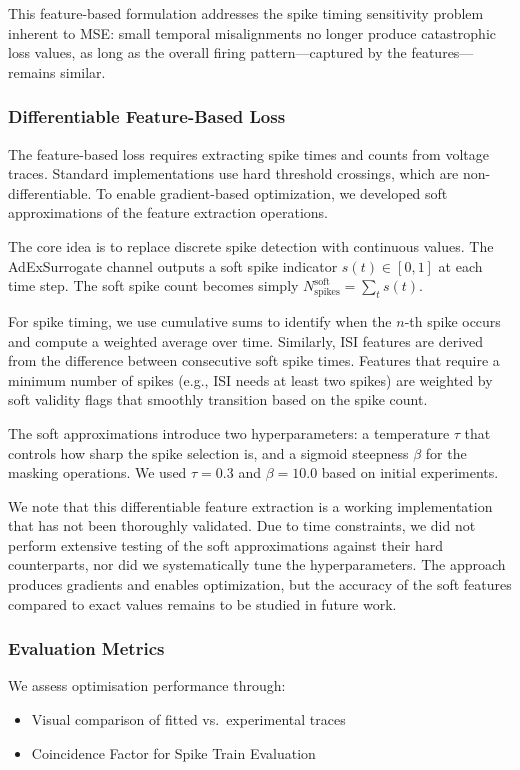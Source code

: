 \documentclass[conference]{IEEEtran}
\begin{document}
This feature-based formulation addresses the spike timing sensitivity problem inherent to MSE:
small temporal misalignments no longer produce catastrophic loss values, as long as the overall firing pattern---captured by the features---remains similar.

\subsubsection{Differentiable Feature-Based Loss}\label{sec:diff-feature-loss}
The feature-based loss requires extracting spike times and counts from voltage traces.
Standard implementations use hard threshold crossings, which are non-differentiable.
To enable gradient-based optimization, we developed soft approximations of the feature extraction operations.

The core idea is to replace discrete spike detection with continuous values.
The AdExSurrogate channel outputs a soft spike indicator $s(t) \in [0, 1]$ at each time step.
The soft spike count becomes simply $N_{\text{spikes}}^{\text{soft}} = \sum_{t} s(t)$.

For spike timing, we use cumulative sums to identify when the $n$-th spike occurs and compute a weighted average over time.
Similarly, ISI features are derived from the difference between consecutive soft spike times.
Features that require a minimum number of spikes (e.g., ISI needs at least two spikes) are weighted by soft validity flags that smoothly transition based on the spike count.

The soft approximations introduce two hyperparameters: a temperature $\tau$ that controls how sharp the spike selection is, and a sigmoid steepness $\beta$ for the masking operations.
We used $\tau = 0.3$ and $\beta = 10.0$ based on initial experiments.

We note that this differentiable feature extraction is a working implementation that has not been thoroughly validated.
Due to time constraints, we did not perform extensive testing of the soft approximations against their hard counterparts, nor did we systematically tune the hyperparameters.
The approach produces gradients and enables optimization, but the accuracy of the soft features compared to exact values remains to be studied in future work.

\subsubsection{Evaluation Metrics}\label{sec:evaluation-metrics}
We assess optimisation performance through:
\begin{itemize}
    \item Visual comparison of fitted vs.\ experimental traces
    \item Coincidence Factor for Spike Train Evaluation
\end{itemize}
\end{document}
